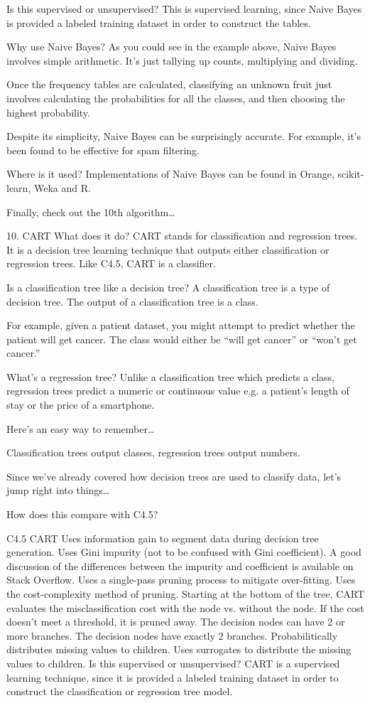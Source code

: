 Is this supervised or unsupervised? This is supervised learning, since Naive Bayes is provided a labeled training dataset in order to construct the tables.

Why use Naive Bayes? As you could see in the example above, Naive Bayes involves simple arithmetic. It’s just tallying up counts, multiplying and dividing.

Once the frequency tables are calculated, classifying an unknown fruit just involves calculating the probabilities for all the classes, and then choosing the highest probability.

Despite its simplicity, Naive Bayes can be surprisingly accurate. For example, it’s been found to be effective for spam filtering.

Where is it used? Implementations of Naive Bayes can be found in Orange, scikit-learn, Weka and R.

Finally, check out the 10th algorithm…

10. CART
What does it do? CART stands for classification and regression trees.  It is a decision tree learning technique that outputs either classification or regression trees. Like C4.5, CART is a classifier.

Is a classification tree like a decision tree? A classification tree is a type of decision tree. The output of a classification tree is a class.

For example, given a patient dataset, you might attempt to predict whether the patient will get cancer. The class would either be “will get cancer” or “won’t get cancer.”

What’s a regression tree? Unlike a classification tree which predicts a class, regression trees predict a numeric or continuous value e.g. a patient’s length of stay or the price of a smartphone.

Here’s an easy way to remember…

Classification trees output classes, regression trees output numbers.

Since we’ve already covered how decision trees are used to classify data, let’s jump right into things…

How does this compare with C4.5?

C4.5	CART
Uses information gain to segment data during decision tree generation.	Uses Gini impurity (not to be confused with Gini coefficient). A good discussion of the differences between the impurity and coefficient is available on Stack Overflow.
Uses a single-pass pruning process to mitigate over-fitting.	Uses the cost-complexity method of pruning. Starting at the bottom of the tree, CART evaluates the misclassification cost with the node vs. without the node. If the cost doesn’t meet a threshold, it is pruned away.
The decision nodes can have 2 or more branches.	The decision nodes have exactly 2 branches.
Probabilitically distributes missing values to children.	Uses surrogates to distribute the missing values to children.
Is this supervised or unsupervised? CART is a supervised learning technique, since it is provided a labeled training dataset in order to construct the classification or regression tree model.

